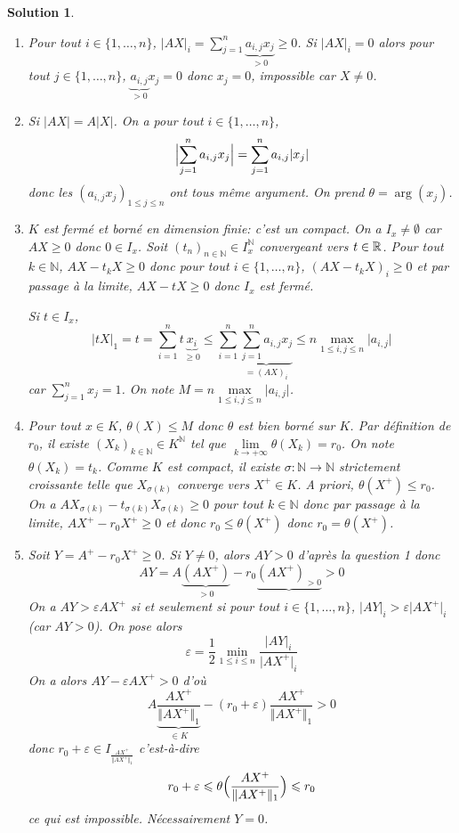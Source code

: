 \documentclass[12pt]{article}
\newtheorem{solution}{Solution}[section]
\theoremstyle{remark}
\newcommand{\N}{\mathbb{N}} \newcommand{\Z}{\mathbb{Z}}
\numberwithin{equation}{section}
\begin{document}
\begin{solution}
	\phantom{}
	\begin{enumerate}
		\item Pour tout $i\in\{1,\dots,n\}$, $\vert AX\vert_{i}=\sum_{j=1}^{n}\underbrace{a_{i,j}x_{j}}_{>0}\geqslant0$. Si $\vert AX\vert_{i}=0$ alors pour tout $j\in\{1,\dots,n\}$, $\underbrace{a_{i,j}}_{>0}x_{j}=0$ donc $x_{j}=0$, impossible car $X\neq 0$.
		
		\item Si $\vert AX\vert=A\vert X\vert$. On a pour tout $i\in\{1,\dots,n\}$,
		$$\Bigl\lvert\sum_{j=1}^{n}a_{i,j}x_{j}\Bigr\rvert=\sum_{j=1}^{n}a_{i,j}\lvert x_{j}\rvert$$
		donc les $(a_{i,j}x_{j})_{1\leqslant j\leqslant n}$ ont tous même argument. On prend $\theta=\arg(x_{j})$.

		\item $K$ est fermé et borné en dimension finie: c'est un compact. On a $I_{x}\neq\emptyset$ car $AX\geqslant0$ donc $0\in I_{x}$. Soit $(t_{n})_{n\in\N}\in I_{x}^{\N}$ convergeant vers $t\in\mathbb{R}$. Pour tout $k\in\N$, $AX-t_{k}X\geqslant0$ donc pour tout $i\in\{1,\dots,n\}$, $(AX-t_{k}X)_{i}\geqslant0$ et par passage à la limite, $AX-tX\geqslant0$ donc $I_{x}$ est fermé.
		
		Si $t\in I_{x}$, 
		$$\vert tX\vert_{1}=t=\sum_{i=1}^{n}t\underbrace{x_{i}}_{\geqslant0}\leqslant\sum_{i=1}^{n}\underbrace{\sum_{j=1}^{n}a_{i,j}x_{j}}_{=(AX)_{i}}\leqslant n\max\limits_{1\leqslant i,j\leqslant n}\vert a_{i,j}\vert$$
		car $\sum_{j=1}^{n}x_{j}=1$.
		On note $M=n\max\limits_{1\leqslant i,j\leqslant n}\vert a_{i,j}\vert$.

		\item Pour tout $x\in K$, $\theta(X)\leqslant M$ donc $\theta$ est bien borné sur $K$. Par définition de $r_{0}$, il existe $(X_{k})_{k\in\N}\in K^{\N}$ tel que $\lim\limits_{k\to+\infty}\theta(X_k)=r_{0}$. On note $\theta(X_{k})=t_{k}$. Comme $K$ est compact, il existe $\sigma\colon\N\to\N$ strictement croissante telle que $X_{\sigma(k)}$ converge vers $X^{+}\in K$. A priori, $\theta(X^{+})\leqslant r_{0}$. On a $AX_{\sigma(k)}-t_{\sigma(k)}X_{\sigma(k)}\geqslant0$ pour tout $k\in\N$ donc par passage à la limite, $AX^{+}-r_{0}X^{+}\geqslant0$ et donc $r_{0}\leqslant\theta(X^{+})$ donc $r_{0}=\theta(X^{+})$.
		
		\item Soit $Y=A^{+}-r_{0}X^{+}\geqslant0$. Si $Y\neq0$, alors $AY>0$ d'après la question 1 donc 
		$$AY=A\underbrace{(AX^{+})}_{>0}-r_{0}\underbrace{(AX^{+})_{>0}}>0$$
		On a $AY>\varepsilon AX^{+}$ si et seulement si pour tout $i\in\{1,\dots,n\}$, $\vert AY\vert_{i}>\varepsilon\vert AX^{+}\vert_{i}$ (car $AY>0$). On pose alors 
		$$\varepsilon=\frac{1}{2}\min\limits_{1\leqslant i\leqslant n}\frac{\vert AY\vert_{i}}{\vert AX^{+}\vert_{i}}$$
		On a alors $AY-\varepsilon AX^{+}>0$ d'où 
		$$A\underbrace{\frac{AX^{+}}{\Vert AX^{+}\Vert_{1}}}_{\in K}-(r_{0}+\varepsilon)\frac{AX^{+}}{\Vert AX^{+}\Vert_{1}}>0$$
		donc $r_{0}+\varepsilon\in I_{\frac{AX^{+}}{\Vert AX^{+}\Vert_{1}}}$ c'est-à-dire 
		$$r_{0}+\varepsilon\leqslant\theta\Bigl(\frac{AX^{+}}{\Vert AX^{+}\Vert_{1}}\Bigr)\leqslant r_{0}$$
		ce qui est impossible. Nécessairement $Y=0$.


\end{enumerate}
\end{solution}
\end{document}
